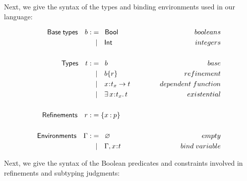 \documentclass[11pt]{article}
\newcommand{\bind}{\hspace{0.05em}{:}\hspace{0.05em}} %
\newcommand{\col}{\mathbin{:}}       %
\begin{document}
Next, we give the syntax of the types and binding environments used in our language:

\begin{align*}
{\sf Base\; types} \quad b :&=\;\;{\sf Bool}{\kern 5em}&booleans\\
                   &\;\;|\quad {\sf Int} &integers \\ \\
{\sf Types} \quad t :&=\;\; b & base \\
                   &\;\;|\quad b\{r\} & refinement \\
                   &\;\;|\quad x\bind t_x \rightarrow t 
                   &dependent\; function\\
                   &\;\;|\quad \exists\, x\bind t_x.\, t 
                   &existential\\ \\
{\sf Refinements} \quad r :&= \{x\col p\}  \\ \\
{\sf Environments} \quad \Gamma :&=\;\; \varnothing
                   {\kern 5em}& empty \\
                   &\;\;|\quad \Gamma, x\bind t & bind\;variable\\
\end{align*}

Next, we give the syntax of the Boolean predicates and constraints involved in refinements and subtyping judgments:
\end{document}
